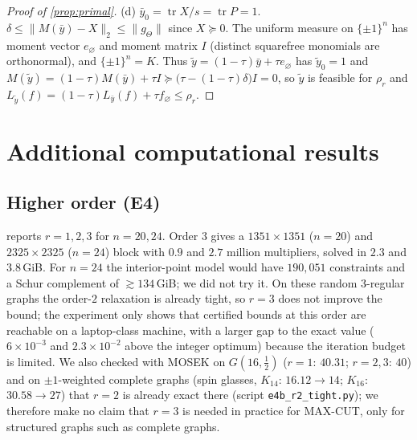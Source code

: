 \documentclass[a4paper,11pt]{article}
\theoremstyle{plain}
\theoremstyle{definition}
\theoremstyle{remark}
\newcommand{\tr}{\operatorname{tr}}
\begin{document}
\begin{proof}[Proof of \cref{prop:primal}]
(d) $\bar y_0=\tr X/s=\tr P=1$. $\delta\le\|M(\bar y)-X\|_2\le\|g_\Theta\|$ since $X\succeq0$. The uniform measure on $\{\pm1\}^n$ has moment vector $e_\varnothing$ and moment matrix $I$ (distinct squarefree monomials are orthonormal), and $\{\pm1\}^n=K$. Thus $\tilde y=(1-\tau)\bar y+\tau e_\varnothing$ has $\tilde y_0=1$ and $M(\tilde y)=(1-\tau)M(\bar y)+\tau I\succeq\big(\tau-(1-\tau)\delta\big)I=0$, so $\tilde y$ is feasible for $\rho_r$ and $L_{\tilde y}(f)=(1-\tau)L_{\bar y}(f)+\tau f_\varnothing\le\rho_r$.
\end{proof}

\section{Additional computational results}\label{app:extra}
\subsection{Higher order (E4)}
 reports $r=1,2,3$ for $n=20,24$. Order $3$ gives a $1351\times1351$ ($n=20$) and $2325\times2325$ ($n=24$) block with $0.9$ and $2.7$ million multipliers, solved in $2.3$ and $3.8$\,GiB. For $n=24$ the interior-point model would have $190{,}051$ constraints and a Schur complement of $\gtrsim134$\,GiB; we did not try it. On these random $3$-regular graphs the order-$2$ relaxation is already tight, so $r=3$ does not improve the bound; the experiment only shows that certified bounds at this order are reachable on a laptop-class machine, with a larger gap to the exact value ($6\times10^{-3}$ and $2.3\times10^{-2}$ above the integer optimum) because the iteration budget is limited. We also checked with MOSEK on $G(16,\frac12)$ ($r=1$: $40.31$; $r=2,3$: $40$) and on $\pm1$-weighted complete graphs (spin glasses, $K_{14}$: $16.12\to14$; $K_{16}$: $30.58\to27$) that $r=2$ is already exact there (script \texttt{e4b\_r2\_tight.py}); we therefore make no claim that $r=3$ is needed in practice for MAX-CUT, only for structured graphs such as complete graphs.
\begin{table}[t]\centering\small

\caption{Higher relaxation orders on random $3$-regular MAX-CUT; ``mem.'' in GiB. The optimum is computed by exhaustive enumeration.}\label{tab:e4}
\end{table}
\end{document}
